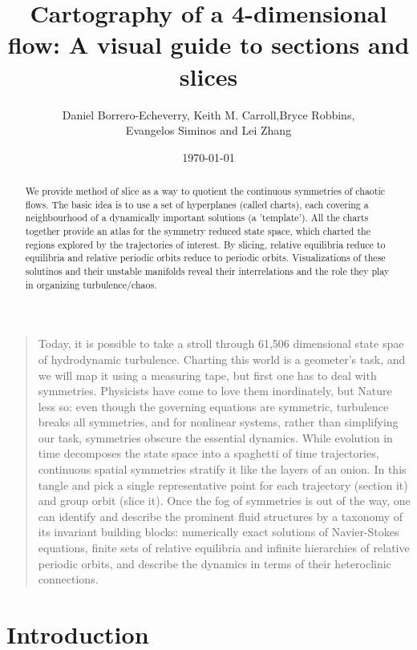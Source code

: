 \documentclass{article}
\title{Cartography of a 4-dimensional flow: A visual guide to sections and slices}
\author{Daniel Borrero-Echeverry, Keith M. Carroll,Bryce Robbins,\\ Evangelos Siminos and Lei Zhang}
\date{\today}
\begin{document}
\maketitle





    \begin{abstract}

We provide method of slice as a way to quotient the continuous symmetries of chaotic flows. The basic idea is to use a set of hyperplanes (called charts), each covering a neighbourhood of a dynamically important solutions (a 'template'). All the charts together provide an atlas for the symmetry reduced state space, which charted the regions explored by the trajectories of interest. By slicing, relative equilibria reduce to equilibria and relative periodic orbits reduce to periodic orbits. Visualizations of these solutinos and their unstable manifolds reveal their interrelations and the role they play in organizing turbulence/chaos.

    \end{abstract}



    \begin{quotation}
Today, it is possible to take a stroll through 61,506 dimensional state spae of hydrodynamic turbulence. Charting this world is a geometer's task, and we will map it using a measuring tape, but first one has to deal with symmetries. Physicists have come to love them inordinately, but Nature less so: even though the governing equations are symmetric, turbulence breaks all symmetries, and for nonlinear systems, rather than simplifying our task, symmetries obscure the essential dynamics. While evolution in time decomposes the state space into a spaghetti of time trajectories, continuous spatial symmetries stratify it like the layers of an onion. In this tangle and pick a single representative point for each trajectory (section it) and group orbit (slice it). Once the fog of symmetries is out of the way, one can identify and describe the prominent fluid structures by a taxonomy of its invariant building blocks: numerically exact solutions of Navier-Stokes equations, finite sets of relative equilibria and infinite hierarchies of relative periodic orbits, and describe the dynamics in terms of their heteroclinic connections.
    \end{quotation}

\section{Introduction}
\label{s:intro}
\end{document}
